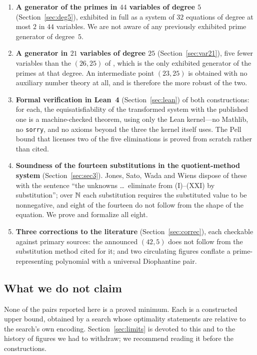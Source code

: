 \begin{enumerate}[label=(C\arabic*),leftmargin=*]
  \item \textbf{A generator of the primes in $44$ variables of degree $5$}
        (Section~\ref{sec:deg5}), exhibited in full as a system of $32$
        equations of degree at most $2$ in $44$ variables. We are not aware of
        any previously exhibited prime generator of degree~$5$.

  \item \textbf{A generator in $21$ variables of degree $25$}
        (Section~\ref{sec:var21}), five fewer variables than the $(26,25)$ of
        \cite{jsww1976}, which is the only exhibited generator of the primes at
        that degree. An intermediate point $(23,25)$ is obtained with no
        auxiliary number theory at all, and is therefore the more robust of the
        two.

  \item \textbf{Formal verification in Lean~4} (Section~\ref{sec:lean}) of both
        constructions: for each, the equisatisfiability of the transformed
        system with the published one is a machine-checked theorem, using only
        the Lean kernel---no Mathlib, no \texttt{sorry}, and no axioms beyond
        the three the kernel itself uses. The Pell bound that licenses two of
        the five eliminations is proved from scratch rather than cited.

  \item \textbf{Soundness of the fourteen substitutions in the quotient-method
        system} (Section~\ref{sec:sec3}). Jones, Sato, Wada and Wiens dispose of
        these with the sentence ``the unknowns \dots\ eliminate from
        (I)--(XXI) by substitution''; over $\mathbb{N}$ each substitution requires the
        substituted value to be nonnegative, and eight of the fourteen do not
        follow from the shape of the equation. We prove and formalize all eight.

  \item \textbf{Three corrections to the literature}
        (Section~\ref{sec:correc}), each checkable against primary sources: the
        announced $(42,5)$ does not follow from the substitution method cited
        for it; and two circulating figures conflate a prime-representing
        polynomial with a universal Diophantine pair.
\end{enumerate}

\subsection{What we do not claim}

None of the pairs reported here is a proved minimum. Each is a constructed upper
bound, obtained by a search whose optimality statements are relative to the
search's own encoding. Section~\ref{sec:limits} is devoted to this and to the
history of figures we had to withdraw; we recommend reading it before the
constructions.

